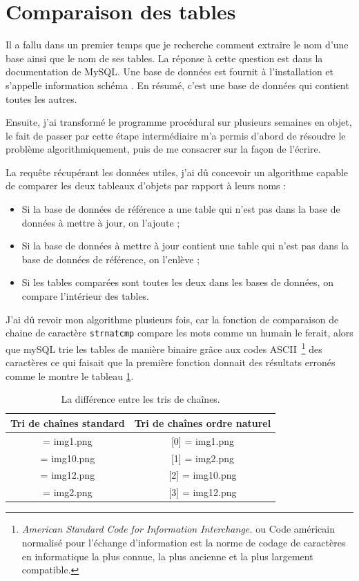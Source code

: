 \section{Comparaison des tables}

Il a fallu dans un premier temps que je recherche comment extraire le nom d'une
base ainsi que le nom de ses tables. La réponse à cette question est dans la
documentation de MySQL. Une base de données est fournit à l'installation et
s'appelle \og information schéma \fg{} . En résumé, c'est une base de données
qui contient toutes les autres.

Ensuite, j'ai transformé le programme procédural sur plusieurs semaines en
objet, le fait de passer par cette étape intermédiaire m'a permis d'abord de
résoudre le problème algorithmiquement, puis de me consacrer sur la façon de
l'écrire.

La requête récupérant les données utiles, j'ai dû concevoir un algorithme
capable de comparer les deux tableaux d'objets par rapport à leurs noms :
\begin{itemize}
    \item Si la base de données de référence a une table qui n'est pas dans
    la base de données à mettre à jour, on l'ajoute ;
    \item Si la base de données à mettre à jour contient une table qui n'est
    pas dans la base de données de référence, on l'enlève ;
    \item Si les tables comparées sont toutes les deux dans les bases de
    données, on compare l'intérieur des tables.
\end{itemize}

J'ai dû revoir mon algorithme plusieurs fois, car la fonction de comparaison de
chaine de caractère \texttt{strnatcmp} compare les mots comme un humain le
ferait, alors que mySQL trie les tables de manière binaire grâce aux codes
ASCII\, \footnote{\emph{American Standard Code for Information Interchange.} ou
\og Code américain normalisé pour l'échange d'information \fg{} est la norme de
codage de caractères en informatique la plus connue, la plus ancienne et la
plus largement compatible.} des caractères ce qui faisait que la première
fonction donnait des résultats erronés comme le montre le tableau \ref{tab}.

\begin{table}
\begin{center}
\begin{tabular}{|c|c|}
\hline
\textbf{Tri de chaînes standard} & \textbf{Tri de chaînes ordre naturel} \\
\hline
[0] = img1.png & [0] = img1.png \\
\hline
[1] = img10.png & [1] = img2.png \\
\hline
[2] = img12.png & [2] = img10.png \\
\hline
[3] = img2.png & [3] = img12.png \\
\hline
\end{tabular}
\caption{La différence entre les tris de chaînes.}
\label{tab}
\end{center}
\end{table}

